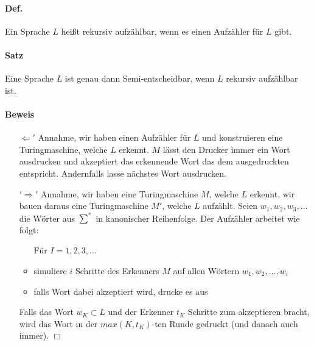 \paragraph*{Def.} Ein Sprache $L$ heißt rekursiv aufzählbar, wenn es einen Aufzähler für $L$ gibt.

\paragraph*{Satz} Eine Sprache $L$ ist genau dann Semi-entscheidbar, wenn $L$ rekursiv aufzählbar ist.

\paragraph*{Beweis} 
\begin{itemize}
	\item[$\Leftarrow'$] Annahme, wir haben einen Aufzähler für $L$ und konstruieren eine Turingmaschine, welche $L$ erkennt. $M$ lässt den Drucker immer ein Wort ausdrucken und akzeptiert das erkennende Wort das dem ausgedruckten entspricht. Andernfalls lasse nächstes Wort ausdrucken.
	\item[$'\Rightarrow'$] Annahme, wir haben eine Turingmaschine $M$, welche $L$ erkennt, wir bauen daraus eine Turingmaschine $M'$, welche $L$ aufzählt. Seien $w_1,w_2,w_3,\dots$ die Wörter aus $\sum^*$ in kanonischer Reihenfolge. Der Aufzähler arbeitet wie folgt:
	\begin{itemize}
		\item[] Für $I=1,2,3,\dots$
		\item simuliere $i$ Schritte des Erkenners $M$ auf allen Wörtern $w_1,w_2,\dots,w_i$
		\item falls Wort dabei akzeptiert wird, drucke es aus
	\end{itemize}
	\item[] Falls das Wort $w_K \subset L$ und der Erkenner $t_K$ Schritte zum akzeptieren bracht, wird das Wort in der $max(K,t_K)$-ten Runde gedruckt (und danach auch immer). $\Box$
\end{itemize}